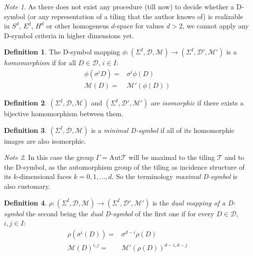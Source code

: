 \documentclass[12pt,a4paper]{article}
\numberwithin{equation}{section}
\theoremstyle{plain}%
\theoremstyle{definition}
\newtheorem{defn}{Definition}[section]
\theoremstyle{remark}
\newtheorem*{note}{Note}
\begin{document}
\begin{note}
  As there does not exist any procedure (till now) to decide whether a D-symbol
  (or any representation of a tiling that the author knows of) is realizable in
  $S^d$, $E^d$, $H^d$ or other homogeneus $d$-space for values $d>2$, we cannot
  apply any D-symbol criteria in higher dimensions yet.
\end{note}

\begin{defn}
  The D-symbol mapping $\phi: (\Sigma^I,\mathcal{D},\mathcal{M}) \rightarrow
  (\Sigma^I,\mathcal{D}',\mathcal{M}')$ is a {\em homomorphism} if for all $D\in
  \mathcal{D}$, $i \in I$:
  \begin{align}
    \phi(\sigma^iD)= & \sigma^i\phi(D) \\
    \mathcal{M}(D)= & \mathcal{M}'(\phi(D))
  \end{align}
\end{defn}


\begin{defn}
  $(\Sigma^I,\mathcal{D},\mathcal{M})$ and
  $(\Sigma^I,\mathcal{D}',\mathcal{M}')$ are {\em isomorphic} if there exists a
  bijective homomorphism between them.
\end{defn}


\begin{defn}
  \label{def:max_D-sym}
  $(\Sigma^I,\mathcal{D},\mathcal{M})$ is a {\em minimal D-symbol} if all of its
  homomorphic images are also isomorphic.
\end{defn}

\begin{note}
  In this case the group $\Gamma=\mathrm{Aut}\mathcal{T}$ will be maximal to the tiling
  $\mathcal{T}$ and to the D-symbol, as the automorphism group of the tiling as
  incidence structure of its $k$-dimensional faces $k=0,1,\ldots,d$. So the
  terminology {\em maximal D-symbol} is also customary.
\end{note}

\begin{defn}
  $\rho: (\Sigma^I,\mathcal{D},\mathcal{M}) \rightarrow
  (\Sigma^I,\mathcal{D}',\mathcal{M}')$ is the {\em dual mapping of a D-symbol}
  the second being the {\em dual D-symbol} of the first one if for every $D\in \mathcal{D}$, $i,j
  \in I$:
  \begin{align}
    \rho(\sigma^i(D))= & \sigma^{d-i}\rho(D) \\
    \mathcal{M}(D)^{i,j}= & \mathcal{M}'(\rho(D))^{d-i,d-j}
  \end{align}
\end{defn}
\end{document}
